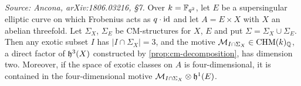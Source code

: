 \begin{lemma}
  \label{lem:exotic-threefold-factor}
  \textit{Source: Ancona, arXiv:1806.03216, §7.}
  Over \(k = \mathbb{F}_{q^2}\), let \(E\) be a supersingular elliptic curve on which
  Frobenius acts as \(q \cdot \mathrm{id}\) and let \(A = E \times X\) with \(X\) an
  abelian threefold. Let \(\Sigma_X\), \(\Sigma_E\) be CM-structures for \(X\),
  \(E\) and put \(\Sigma = \Sigma_X \cup \Sigma_E\). Then any exotic subset \(I\)
  has \(|I \cap \Sigma_X| = 3\), and the motive
  \(\mathcal{M}_{I \cap \Sigma_X} \in \mathrm{CHM}(k)_{\mathbb{Q}}\), a direct factor of
  \(\mathfrak{h}^3(X)\) constructed by \cref{prop:cm-decomposition}, has dimension two.
  Moreover, if the space of exotic classes on \(A\) is four-dimensional, it is
  contained in the four-dimensional motive
  \(\mathcal{M}_{I \cap \Sigma_X} \otimes \mathfrak{h}^1(E)\).
\end{lemma}

